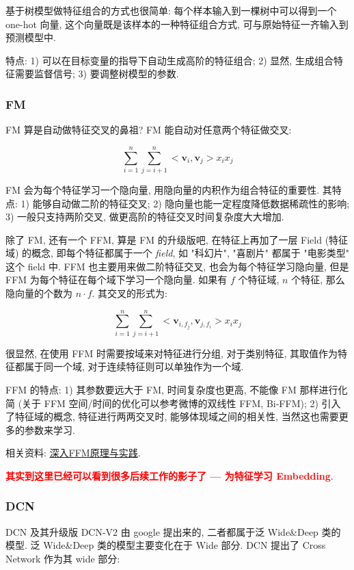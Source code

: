 基于树模型做特征组合的方式也很简单: 每个样本输入到一棵树中可以得到一个 one-hot 向量, 这个向量既是该样本的一种特征组合方式, 可与原始特征一齐输入到预测模型中. 

特点: 1) 可以在目标变量的指导下自动生成高阶的特征组合; 2) 显然, 生成组合特征需要监督信号; 3) 要调整树模型的参数.

\subsubsection{FM}

FM\cite{steffen_fm_2011} 算是自动做特征交叉的鼻祖? FM 能自动对任意两个特征做交叉:

$$
\sum_{i=1}^n \sum_{j=i+1}^n <\bm{v}_i, \bm{v}_j> x_i x_j
$$

FM 会为每个特征学习一个隐向量, 用隐向量的内积作为组合特征的重要性. 其特点: 1) 能够自动做二阶的特征交叉; 2) 隐向量也能一定程度降低数据稀疏性的影响; 3) 一般只支持两阶交叉, 做更高阶的特征交叉时间复杂度大大增加.

除了 FM, 还有一个 FFM\cite{juan_ffm_2016}, 算是 FM 的升级版吧, 在特征上再加了一层 Field (特征域) 的概念, 即每个特征都属于一个 \textit{field}, 如 "科幻片", "喜剧片" 都属于 "电影类型" 这个 field 中. FFM 也主要用来做二阶特征交叉, 也会为每个特征学习隐向量, 但是 FFM 为每个特征在每个域下学习一个隐向量. 如果有 $f$ 个特征域, $n$ 个特征, 那么隐向量的个数为 $n \cdot f$. 其交叉的形式为:

$$
\sum_{i=1}^n \sum_{j=i+1}^n <\bm{v}_{i, f_j}, \bm{v}_{j, f_i}> x_i x_j
$$

很显然, 在使用 FFM 时需要按域来对特征进行分组, 对于类别特征, 其取值作为特征都属于同一个域, 对于连续特征则可以单独作为一个域. 

FFM 的特点: 1) 其参数要远大于 FM, 时间复杂度也更高, 不能像 FM 那样进行化简 (关于 FFM 空间/时间的优化可以参考微博的双线性 FFM, Bi-FFM); 2) 引入了特征域的概念, 特征进行两两交叉时, 能够体现域之间的相关性, 当然这也需要更多的参数来学习.


相关资料: \href{https://tech.meituan.com/2016/03/03/deep-understanding-of-ffm-principles-and-practices.html}{深入FFM原理与实践}. 

\textcolor{red}{\textbf{其实到这里已经可以看到很多后续工作的影子了 --- 为特征学习 Embedding}}. 

\subsubsection{DCN}

DCN\cite{wang_dcn_2017} 及其升级版 DCN-V2\cite{wang_dcnv2_2021} 由 google 提出来的, 二者都属于泛 Wide\&Deep 类的模型. 泛 Wide\&Deep 类的模型主要变化在于 Wide 部分. DCN 提出了 Cross Network 作为其 wide 部分:

